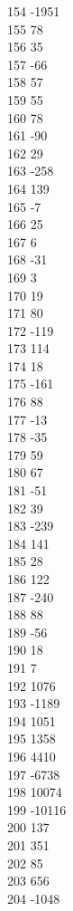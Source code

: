 { 154	-1951 \\
 155	78 \\
 156	35 \\
 157	-66 \\
 158	57 \\
 159	55 \\
 160	78 \\
 161	-90 \\
 162	29 \\
 163	-258 \\
 164	139 \\
 165	-7 \\
 166	25 \\
 167	6 \\
 168	-31 \\
 169	3 \\
 170	19 \\
 171	80 \\
 172	-119 \\
 173	114 \\
 174	18 \\
 175	-161 \\
 176	88 \\
 177	-13 \\
 178	-35 \\
 179	59 \\
 180	67 \\
 181	-51 \\
 182	39 \\
 183	-239 \\
 184	141 \\
 185	28 \\
 186	122 \\
 187	-240 \\
 188	88 \\
 189	-56 \\
 190	18 \\
 191	7 \\
 192	1076 \\
 193	-1189 \\
 194	1051 \\
 195	1358 \\
 196	4410 \\
 197	-6738 \\
 198	10074 \\
 199	-10116 \\
 200	137 \\
 201	351 \\
 202	85 \\
 203	656 \\
 204	-1048 \\
}
